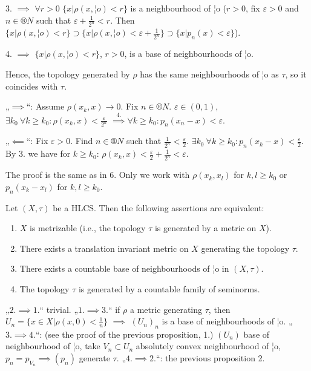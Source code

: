 \documentclass[12pt]{article}					%
\begin{document}
\begin{tvrzeni}
	\begin{dukazin}
		3. $\implies$ $\forall r > 0$ $\{x | ρ(x, ¦o) < r\}$ is a neighbourhood of ¦o ($r > 0$, fix $ε > 0$ and $n \in ®N$ such that $ε + \frac{1}{2^n} < r$. Then $\{x | ρ(x, ¦o) < r\} \supset \{x | ρ(x, ¦o) < ε + \frac{1}{2^n}\} \supset \{x | p_n(x) < ε\}$).

		4. $\implies$ $\{x | ρ(x, ¦o) < r\}$, $r > 0$, is a base of neighbourhoods of ¦o.

		Hence, the topology generated by $ρ$ has the same neighbourhoods of ¦o as $τ$, so it coincides with $τ$.
	\end{dukazin}

	\begin{dukazin}
		„$\implies$“: Assume $ρ(x_k, x) \rightarrow 0$. Fix $n \in ®N$. $ε \in (0, 1)$, $\exists k_0\ \forall k ≥ k_0: ρ(x_k, x) < \frac{ε}{2^n}$ $\overset{4.} \implies \forall k ≥ k_0: p_n(x_n - x) < ε$.

		„$\impliedby$“: Fix $ε > 0$. Find $n \in ®N$ such that $\frac{1}{2^n} < \frac{ε}{2}$. $\exists k_0\ \forall k ≥ k_0: p_n(x_k - x) < \frac{ε}{2}$. By 3. we have for $k ≥ k_0$: $ρ(x_k, x) < \frac{ε}{2} + \frac{1}{2^n} < ε$.
	\end{dukazin}

	\begin{dukazin}
		The proof is the same as in 6. Only we work with $ρ(x_k, x_l)$ for $k, l ≥ k_0$ or $p_n(x_k - x_l)$ for $k, l ≥ k_0$.
	\end{dukazin}
\end{tvrzeni}

\begin{veta}
	Let $(X, τ)$ be a HLCS. Then the following assertions are equivalent:

	\begin{enumerate}
		\item $X$ is metrizable (i.e., the topology $τ$ is generated by a metric on $X$).
		\item There exists a translation invariant metric on $X$ generating the topology $τ$.
		\item There exists a countable base of neighbourhoods of ¦o in $(X, τ)$.
		\item The topology $τ$ is generated by a countable family of seminorms.
	\end{enumerate}


	\begin{dukazin}
		„$2. \implies 1.$“ trivial. „$1. \implies 3.$“ if $ρ$ a metric generating $τ$, then $U_n = \{x \in X | ρ(x, 0) < \frac{1}{n}\}$ $\implies$ $(U_n)_n$ is a base of neighbourhoods of ¦o. „$3. \implies 4.$“: (see the proof of the previous proposition, 1.) $(U_n)$ base of neighbourhood of ¦o, take $V_n \subset U_n$ absolutely convex neighbourhood of ¦o, $p_n = p_{V_n} \implies (p_n)$ generate $τ$. „$4. \implies 2.$“: the previous proposition 2.
	\end{dukazin}
\end{veta}
\end{document}
